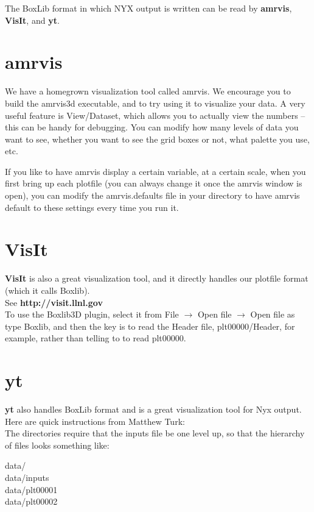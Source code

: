 The BoxLib format in which NYX output is written can be read by {\bf amrvis}, {\bf VisIt}, and {\bf yt}.

\section{amrvis}
We have a homegrown visualization tool called amrvis. We encourage you to build the amrvis3d executable, 
and to try using it to visualize your data. A very useful feature is View/Dataset, which allows you to actually 
view the numbers -- this can be handy for debugging. 
You can modify how many levels of data you want to see, whether you want to see the grid boxes or not, what palette you use, etc.

If you like to have amrvis display a certain variable, at a certain scale, when you first bring up each plotfile 
(you can always change it once the amrvis window is open), you can modify the amrvis.defaults file in your directory 
to have amrvis default to these settings every time you run it. 

\section{VisIt}
{\bf VisIt} is also a great visualization tool, and it directly handles our plotfile format (which it calls Boxlib).   \\

\noindent See {\bf http://visit.llnl.gov} \\

\noindent To use the Boxlib3D plugin, select it from File $\rightarrow$ Open file $\rightarrow$ Open file as type Boxlib, 
and then the key is to read the Header file, plt00000/Header, for example, rather than telling to to read plt00000.


\section{yt}

{\bf yt} also handles BoxLib format and is a great visualization tool for Nyx output.   \\

\noindent Here are quick instructions from Matthew Turk: \\

\noindent The directories require that the inputs file be one level up, so that the hierarchy of files looks something like:

\noindent data/  \\
\noindent data/inputs \\
\noindent data/plt00001 \\
\noindent data/plt00002 \\

